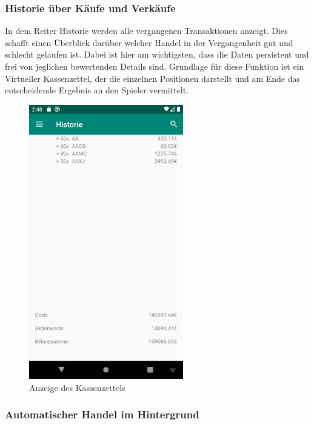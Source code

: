 \documentclass[10pt]{scrartcl}
\begin{document}
\subsubsection{Historie über Käufe und Verkäufe}

In dem Reiter Historie werden alle vergangenen Transaktionen anzeigt. Dies schafft einen Überblick darüber welcher Handel in der Vergangenheit gut und  schlecht gelaufen ist. Dabei ist hier am wichtigsten, dass die Daten persistent und frei von jeglichen bewertenden Details sind. Grundlage für diese Funktion ist ein Virtueller Kassenzettel, der die einzelnen Positionen darstellt und am Ende das entscheidende Ergebnis an den Spieler vermittelt.

\begin{figure}[H]
	\centering
	\includegraphics[width=0.6\textwidth]{Bilder/Prsi/kassenzettel.png}
	\caption{Anzeige des Kassenzettels}
\end{figure}

\subsubsection{Automatischer Handel im Hintergrund}
\end{document}
